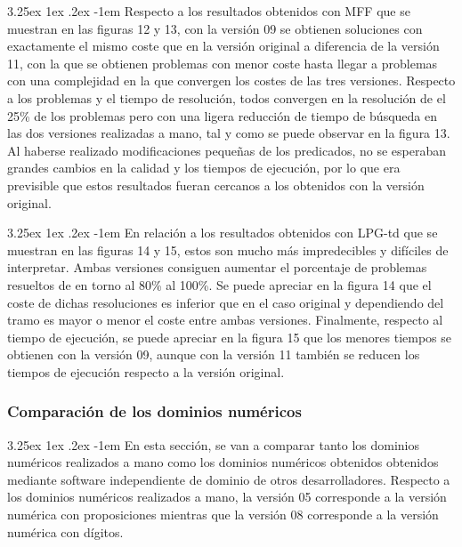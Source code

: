\documentclass{article}
\makeatletter
\renewcommand\paragraph{\@startsection{paragraph}{5}{\z@}%
      {3.25ex \@plus1ex \@minus.2ex}%
      {-1em}%
      {\normalfont\normalsize\bfseries}}
\makeatother
\begin{document}
    \paragraph{}
    Respecto a los resultados obtenidos con MFF que se muestran en las figuras 12 y 13, con la versión 09 se obtienen soluciones con exactamente el mismo coste que en la versión original a diferencia de la versión 11, con la que se obtienen problemas con menor coste hasta llegar a problemas con una complejidad en la que convergen los costes de las tres versiones. Respecto a los problemas y el tiempo de resolución, todos convergen en la resolución de el 25\% de los problemas pero con una ligera reducción de tiempo de búsqueda en las dos versiones realizadas a mano, tal y como se puede observar en la figura 13. Al haberse realizado modificaciones pequeñas de los predicados, no se esperaban grandes cambios en la calidad y los tiempos de ejecución, por lo que era previsible que estos resultados fueran cercanos a los obtenidos con la versión original.
    
    \paragraph{}
    En relación a los resultados obtenidos con LPG-td que se muestran en las figuras 14 y 15, estos son mucho más impredecibles y difíciles de interpretar. Ambas versiones consiguen aumentar el porcentaje de problemas resueltos de en torno al 80\% al 100\%. Se puede apreciar en la figura 14 que el coste de dichas resoluciones es inferior que en el caso original y dependiendo del tramo es mayor o menor el coste entre ambas versiones. Finalmente, respecto al tiempo de ejecución, se puede apreciar en la figura 15 que los menores tiempos se obtienen con la versión 09, aunque con la versión 11 también se reducen los tiempos de ejecución respecto a la versión original.
    
    \subsubsection{Comparación de los dominios numéricos}
    \paragraph{}
    En esta sección, se van a comparar tanto los dominios numéricos realizados a mano como los dominios numéricos obtenidos obtenidos mediante software independiente de dominio de otros desarrolladores. Respecto a los dominios numéricos realizados a mano, la versión 05 corresponde a la versión numérica con proposiciones mientras que la versión 08 corresponde a la versión numérica con dígitos.
    
\end{document}

